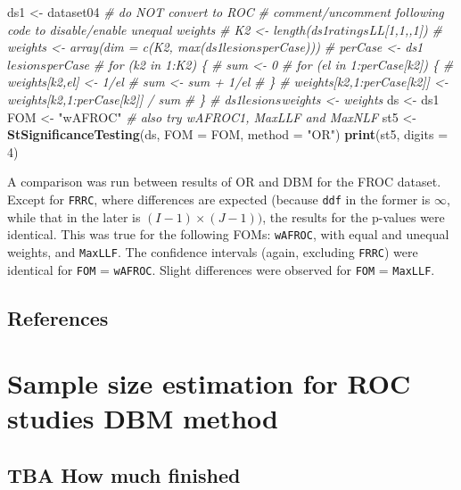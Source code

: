 \documentclass[
]{book}
\newenvironment{Shaded}{\begin{snugshade}}{\end{snugshade}}
\newcommand{\CommentTok}[1]{\textcolor[rgb]{0.56,0.35,0.01}{\textit{#1}}}
\newcommand{\DataTypeTok}[1]{\textcolor[rgb]{0.13,0.29,0.53}{#1}}
\newcommand{\DecValTok}[1]{\textcolor[rgb]{0.00,0.00,0.81}{#1}}
\newcommand{\KeywordTok}[1]{\textcolor[rgb]{0.13,0.29,0.53}{\textbf{#1}}}
\newcommand{\NormalTok}[1]{#1}
\newcommand{\StringTok}[1]{\textcolor[rgb]{0.31,0.60,0.02}{#1}}
\begin{document}
\begin{Shaded}
\begin{Highlighting}[]
\NormalTok{ds1 <-}\StringTok{ }\NormalTok{dataset04 }\CommentTok{# do NOT convert to ROC}
\CommentTok{# comment/uncomment following code to disable/enable unequal weights}
\CommentTok{# K2 <- length(ds1$ratings$LL[1,1,,1])}
\CommentTok{# weights <- array(dim = c(K2, max(ds1$lesions$perCase)))}
\CommentTok{# perCase <- ds1$lesions$perCase}
\CommentTok{# for (k2 in 1:K2) \{}
\CommentTok{#   sum <- 0}
\CommentTok{#   for (el in 1:perCase[k2]) \{}
\CommentTok{#     weights[k2,el] <- 1/el}
\CommentTok{#     sum <- sum + 1/el}
\CommentTok{#   \}}
\CommentTok{#   weights[k2,1:perCase[k2]] <- weights[k2,1:perCase[k2]] / sum}
\CommentTok{# \}}
\CommentTok{# ds1$lesions$weights <- weights}
\NormalTok{ds <-}\StringTok{ }\NormalTok{ds1}
\NormalTok{FOM <-}\StringTok{ "wAFROC"} \CommentTok{# also try wAFROC1, MaxLLF and MaxNLF}
\NormalTok{st5 <-}\StringTok{ }\KeywordTok{StSignificanceTesting}\NormalTok{(ds, }\DataTypeTok{FOM =}\NormalTok{ FOM, }\DataTypeTok{method =} \StringTok{"OR"}\NormalTok{)}
\KeywordTok{print}\NormalTok{(st5, }\DataTypeTok{digits =} \DecValTok{4}\NormalTok{)}
\end{Highlighting}
\end{Shaded}

A comparison was run between results of OR and DBM for the FROC dataset. Except for \texttt{FRRC}, where differences are expected (because \texttt{ddf} in the former is \(\infty\), while that in the later is \((I-1)\times(J-1))\), the results for the p-values were identical. This was true for the following FOMs: \texttt{wAFROC}, with equal and unequal weights, and \texttt{MaxLLF}. The confidence intervals (again, excluding \texttt{FRRC}) were identical for \texttt{FOM} = \texttt{wAFROC}. Slight differences were observed for \texttt{FOM} = \texttt{MaxLLF}.

\hypertarget{or-applications-references}{%
\section{References}\label{or-applications-references}}

\hypertarget{roc-sample-size-dbm}{%
\chapter{Sample size estimation for ROC studies DBM method}\label{roc-sample-size-dbm}}

\hypertarget{roc-sample-size-dbm-how-much-finished}{%
\section{TBA How much finished}\label{roc-sample-size-dbm-how-much-finished}}
\end{document}
